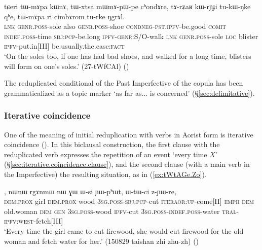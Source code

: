 \begin{exe}
\ex \label{ex:tWxtsa.mWmApWpe}
\gll tɕeri tɯ-mɤpa kɯnɤ, tɯ-xtsa mɯ\redp{}mɤ-pɯ-pe cʰondɤre,  tɤ-rʑaʁ kɯ-rɲɟi tu-kɯ-ŋke qʰe, tɯ-mɤpa ri cimbɤrom tu-rke ŋgrɤl. \\
\textsc{lnk} \textsc{genr}.\textsc{poss}-sole also \textsc{genr}.\textsc{poss}-shoe \textsc{cond}\redp{}\textsc{neg}-\textsc{pst}.\textsc{ipfv}-be.good  \textsc{comit} \textsc{indef}.\textsc{poss}-time \textsc{sbj}:\textsc{pcp}-be.long \textsc{ipfv}-\textsc{genr}:S/O-walk \textsc{lnk} \textsc{genr}.\textsc{poss}-sole \textsc{loc} blister \textsc{ipfv}-put.in[III] be.usually.the.case:\textsc{fact} \\
\glt `On the soles too, if one has had bad shoes, and walked for a long time, blisters will form on one's soles.' (27-tWfCAl)
()
\end{exe}

The reduplicated conditional  of the Past Imperfective of the copula  has been grammaticalized as a topic marker  `as far as... is concerned' (§\ref{sec:delimitative}).


\subsubsection{Iterative coincidence} \label{sec:iterative.coincidence}
One of the meaning of initial reduplication with verbs in Aorist form is iterative coincidence (\citealt[295--296]{jacques14linking}). In this biclausal construction, the first clause with the reduplicated verb expresses the repetition of an event `every time $X$' (§\ref{sec:iterative.coincidence.clause}), and the second clause (with a main verb in the Imperfective) the resulting situation, as in (\ref{ex:tWtAGe.Zo}).

\begin{exe}
\ex \label{ex:tWtAGe.Zo}
, nɯnɯ rgɤnmɯ nɯ ɣɯ ɯ-si ɲɯ-pʰɯt, ɯ-tɯ-ci z-ɲɯ-re, \\
\textsc{dem}.\textsc{prox} girl \textsc{dem}.\textsc{prox} wood \textsc{3sg}.\textsc{poss}-\textsc{sbj}:\textsc{pcp}-cut \textsc{iter}\redp{}\textsc{aor}:\textsc{up}-come[II] \textsc{emph} \textsc{dem} old.woman \textsc{dem} \textsc{gen} \textsc{3sg}.\textsc{poss}-wood \textsc{ipfv}-cut \textsc{3sg}.\textsc{poss}-\textsc{indef}.\textsc{poss}-water \textsc{tral}-\textsc{ipfv}:\textsc{west}-fetch[III] \\
\glt `Every time the girl came to cut firewood, she would cut firewood for the old woman and fetch water for her.' (150829 taishan zhi zhu-zh)
()
\end{exe}

